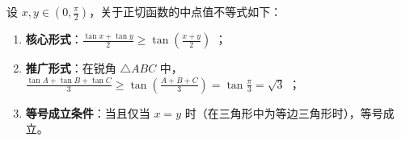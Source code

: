 \begin{statementbox}
设 $x, y \in \left(0, \frac{\pi}{2}\right)$，关于正切函数的中点值不等式如下：
\begin{enumerate}
    \item \textbf{核心形式}：$\frac{\tan x + \tan y}{2} \geqslant \tan\left(\frac{x+y}{2}\right)$ ；
    \item \textbf{推广形式}：在锐角 $\triangle ABC$ 中，$\frac{\tan A + \tan B + \tan C}{3} \geqslant \tan\left(\frac{A+B+C}{3}\right) = \tan\frac{\pi}{3} = \sqrt{3}$ ；
    \item \textbf{等号成立条件}：当且仅当 $x = y$ 时（在三角形中为等边三角形时），等号成立。
\end{enumerate}
\end{statementbox}